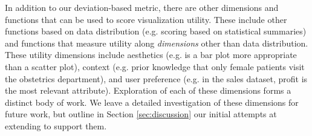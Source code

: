 In addition to our deviation-based metric, there are other dimensions and
functions that can be used to score visualization utility.
These include other functions based on data distribution (e.g. scoring based on 
statistical summaries) and functions that measure utility along {\em 
dimensions} other than data distribution. 
These utility dimensions 
include aesthetics (e.g. is a bar plot more appropriate than a 
scatter plot), context (e.g. prior knowledge that only female patients visit the
obstetrics department), and user preference (e.g. in the sales dataset, profit is
the most relevant attribute).
Exploration of each of these dimensions forms a distinct body of work.
We leave a detailed investigation of these dimensions for future work, but 
outline in Section \ref{sec:discussion} 
our initial attempts at extending \SeeDB to support them.




